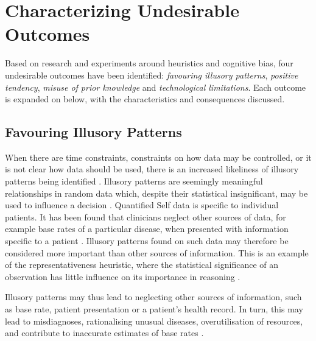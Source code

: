 \documentclass{chi-ext}
\begin{document}
\section{Characterizing Undesirable Outcomes}

  Based on research and experiments around heuristics and cognitive bias, four undesirable outcomes have been identified: \textit{favouring illusory patterns}, \textit{positive tendency}, \textit{misuse of prior knowledge} and \textit{technological limitations}. Each outcome is expanded on below, with the characteristics and consequences discussed. 


\subsection{Favouring Illusory Patterns}
  When there are time constraints, constraints on how data may be controlled, or it is not clear how data should be used, there is an increased likeliness of illusory patterns being identified \cite{Whitson2008}. Illusory patterns are seemingly meaningful relationships in random data which, despite their statistical insignificant, may be used to influence a decision \cite{Kahneman2012}.
  Quantified Self data is specific to individual patients. It has been found that clinicians neglect other sources of data, for example base rates of a particular disease, when presented with information specific to a patient \cite{Bar-Hillel1980}. Illusory patterns found on such data may therefore be considered more important than other sources of information. This is an example of the representativeness heuristic, where the statistical significance of an observation has little influence on its importance in reasoning \cite{Kahneman2012}. 

  Illusory patterns may thus lead to neglecting other sources of information, such as base rate, patient presentation or a patient's health record. In turn, this may lead to misdiagnoses, rationalising unusual diseases, overutilisation of resources, and contribute to inaccurate estimates of base rates \cite{Croskerry2002}.  

\end{document}
